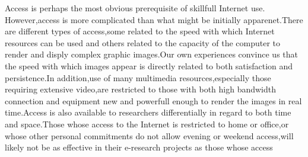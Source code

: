 \documentclass[10pt,a4paper]{book}
\begin{document}
Access is perhaps the most obvious prerequisite of skillfull Internet use. However,access is more complicated than what might be initially apparenet.There are different types of access,some related to the speed with which Internet resources can be used and others related to the capacity of the computer to render and disply complex graphic images.Our own experiences convince us that the speed with which images appear is directly related to both satisfaction and persistence.In addition,use of many multimedia resources,especially those requiring extensive video,are restricted to those with both high bandwidth connection and equipment new and powerfull enough to render the images in real time.Access is also available to researchers differentially in regard to both time and space.Those whose access to the Internet is restricted to home or office,or whose other personal commitments do not allow evening or weekend access,will likely not be as effective in their e-research projects as those whose access 
\end{document}
